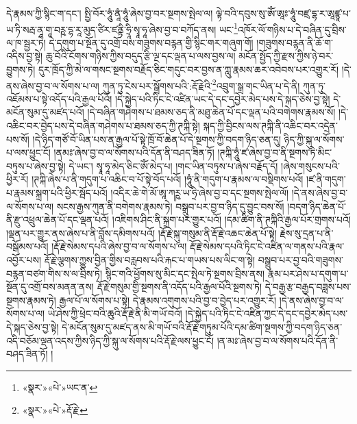 དེ་རྣམས་ཀྱི་སྙིང་ག་དང་། སྤྱི་བོར་ཧཱུཾ་ནཱཾ་ཧཱུཾ་ཞེས་བྱ་བར་སྔགས་སྤེལ་ལ། ལྟེ་བའི་དབུས་སུ་ཨོཾ་ཨཱཿ་ཧཱུཾ་བཛྲ་དྷ་ར་ཨཱཛྙཱ་པ་ཡ་ཏི་སརྦ་ནཱ་གཱ་བཪྵ་དྷ་རཱ་མུད་ཙིར་ཛནྟི་ཧྲཱི་སྭཱ་ཧཱ་ཞེས་བྱ་བ་བཀོད་ནས། ཡང་\footnote{«སྣར་»«པེ་»ཡང་ན་}འཁོར་ལོ་གཉིས་པ་དེ་བཞིན་དུ་བྲིས་ལ་ཁ་སྦྱར་ཏེ། དེ་དགུག་པ་སྔོན་དུ་འགྲོ་བས་གཟུགས་བརྙན་གྱི་སྙིང་གར་གཞུག་གོ། །གཟུགས་བརྙན་ནི་ཆོ་ག་འདིས་བྱ་སྟེ། ཆུ་བོའི་ངོགས་གཉིས་ཀྱིས་བདུད་རྩི་ལྔ་དང་ལྡན་པ་ལས་བྱས་ལ། མངོན་སྤྱོད་ཀྱི་རྫས་ཀྱིས་ཉེ་བར་བྱུགས་ཏེ། དུར་ཁྲོད་ཀྱི་མེ་ལ་གསང་སྔགས་བརྗོད་ཅིང་གདུང་བར་བྱས་ན་ཀླུ་རྣམས་ཆར་འབེབས་པར་འགྱུར་རོ། །དེ་ནས་ཞེས་བྱ་བ་ལ་སོགས་པ་ལ། ཀུན་ཏུ་ངེས་པར་སྒྲོགས་པའི་:རྡོ་རྗེའི་\footnote{«སྣར་»«པེ་»རྡོ་རྗེ་}འབྲུག་སྒྲ་གང་ཡིན་པ་དེ་ནི། ཀུན་ཏུ་འཇོམས་པ་སྟེ་འདོད་པའི་རྒྱལ་པོའོ། །དེ་སྐྱེད་པའི་ཏིང་ངེ་འཛིན་ཡང་དེ་དང་དབྱེར་མེད་པས་དེ་སྐད་ཅེས་བྱ་སྟེ། དེ་མངོན་སུམ་དུ་མཛད་པའོ། །དེ་བཞིན་གཤེགས་པ་ཐམས་ཅད་ནི་མཐུ་ཆེན་པོ་དང་ལྡན་པའི་བགེགས་རྣམས་སོ། །དེ་འཆིང་བར་བྱེད་པས་དེ་བཞིན་གཤེགས་པ་ཐམས་ཅད་ཀྱི་ཊཀྐི་སྟེ། སྐད་ཀྱི་བྱིངས་ལས་ཊཀྐི་ནི་འཆིང་བར་འདྲེན་པས་སོ། །དེ་ཉིད་གཙོ་བོ་ཡིན་པས་ན་རྒྱལ་པོ་སྟེ་ཁྲོ་བོ་ཆེན་པོ་དེ་སྔགས་ཀྱི་བདག་ཉིད་ཅན་དུ། ཉིད་ཀྱི་སྐུ་ལ་སོགས་པ་ལས་ཕྱུང་ངོ། །ནམཿ་ཞེས་བྱ་བ་ལ་སོགས་པའི་དོན་ནི་བཤད་ཟིན་ཏོ། །ཊཀྐི་ཧཱུཾ་ཛ་ཞེས་བྱ་བ་ནི་སྔགས་ཏེ་མིང་བཏུས་པ་ཞེས་བྱ་སྟེ། དེ་ཡང་། སྭཱ་ཧཱ་མེད་ཅིང་ཨོཾ་མེད་པ། །གང་ཡིན་བཏུས་པ་ཞེས་བརྗོད་དོ། །ཞེས་གསུངས་པའི་ཕྱིར་རོ། །ཊཀྐི་ཞེས་པ་ནི་གདུག་པ་འཆིང་བ་པོ་སྟེ་བོད་པའོ། །ཧཱུཾ་ནི་གདུག་པ་རྣམས་ལ་བསྡིགས་པའོ། །ཛ་ནི་གདུག་པ་རྣམས་སྐྲག་པའི་ཕྱིར་སྦོད་པའོ། །འདིར་ཆེ་གེ་མོ་ཨཱ་ཀཪྵ་ཡ་ཧྲི་ཞེས་བྱ་བ་དང་སྔགས་སྤེལ་ལོ། །དེ་ནས་ཞེས་བྱ་བ་ལ་སོགས་པ་ལ། སངས་རྒྱས་ཀུན་ནི་བགེགས་རྣམས་ཏེ། བསྒྲུབ་པར་བྱ་བ་ཉིད་དུ་བྱུང་བས་སོ། །བདག་ཉིད་ཆེན་པོ་ནི་རྫུ་འཕྲུལ་ཆེན་པོ་དང་ལྡན་པའོ། །འཇིགས་ཤིང་ནི་སྐྲག་པར་གྱུར་པའོ། །དམ་ཚིག་ནི་ཊཀྐིའི་རྒྱལ་པོར་གྲགས་པའོ། །ལྡན་པར་གྱུར་ནས་ཞེས་པ་ནི་བློས་དམིགས་པའོ། །རྡོ་རྗེ་སྐུ་གསུམ་ནི་རྡོ་རྗེ་འཆང་ཆེན་པོ་སྟེ། རྗེས་སུ་དྲན་པ་ནི་བསྒོམས་པའོ། །རྡོ་རྗེ་སེམས་དཔའི་ཞེས་བྱ་བ་ལ་སོགས་པ་ལ། རྡོ་རྗེ་སེམས་དཔའི་ཏིང་ངེ་འཛིན་ལ་གནས་པའི་རྣལ་འབྱོར་པས། རྡོ་རྗེ་ལྕགས་ཀྱུས་བྱིན་གྱིས་བརླབས་པའི་རྐང་པ་གཡས་པས་ལིང་ག་སྟེ། བསྒྲུབ་པར་བྱ་བའི་གཟུགས་བརྙན་བཙག་གིས་ས་ལ་བྲིས་ཏེ། སྙིང་གའི་ཕྱོགས་སུ་མིང་དང་སྤེལ་ཏེ་སྔགས་བྲིས་ནས། རྣམ་པར་ཤེས་པ་དགུག་པ་སྔོན་དུ་འགྲོ་བས་མནན་ནས། རྡོ་རྗེ་གསུམ་གྱི་སྔགས་ནི་འདོད་པའི་རྒྱལ་པོའི་སྔགས་ཏེ། དེ་བརྒྱ་རྩ་བརྒྱད་བཟླས་པས་སྔགས་རྣམས་ཏེ། རྒྱལ་པོ་ལ་སོགས་པ་སྟེ། དེ་རྣམས་འགུགས་པའི་བྱ་བ་བྱེད་པར་འགྱུར་རོ། །དེ་ནས་ཞེས་བྱ་བ་ལ་སོགས་པ་ལ། ཡེ་ཤེས་ཀྱི་ཕྲེང་བའི་ཆུའི་རྡོ་རྗེ་ནི་མི་གཡོ་བའོ། །དེ་སྐྱེད་པའི་ཏིང་ངེ་འཛིན་ཀྱང་དེ་དང་དབྱེར་མེད་པས་དེ་སྐད་ཅེས་བྱ་སྟེ། དེ་མངོན་སུམ་དུ་མཛད་ནས་མི་གཡོ་བའི་རྡོ་རྗེ་གཏུམ་པོའི་དམ་ཚིག་སྔགས་ཀྱི་བདག་ཉིད་ཅན་འདི་བཅོམ་ལྡན་འདས་ཀྱིས་ཉིད་ཀྱི་སྐུ་ལ་སོགས་པའི་རྡོ་རྗེ་ལས་ཕྱུང་ངོ། །ན་མཿ་ཞེས་བྱ་བ་ལ་སོགས་པའི་དོན་ནི་བཤད་ཟིན་ཏོ། །
